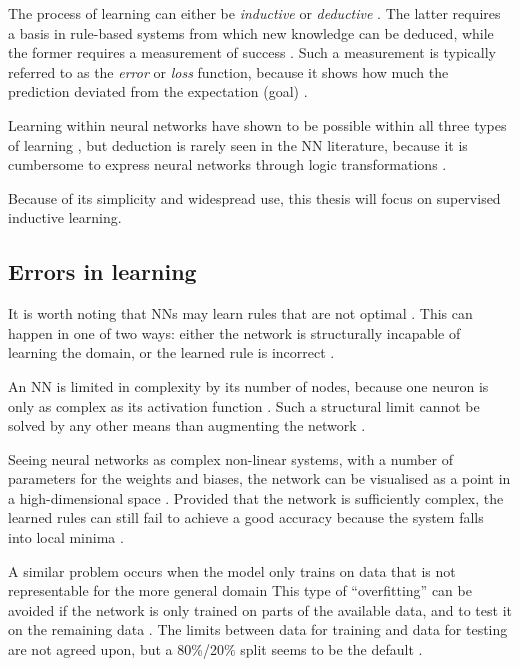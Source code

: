 \documentclass[report.tex]{subfiles}
\begin{document}
The process of learning can either be \textit{inductive}
or \textit{deductive}  \cite[p. 704]{Russel2007}.
The latter requires a basis in rule-based systems from which new knowledge can
be deduced, while the former requires a measurement of success \cite[p. 705]{Russel2007}.
Such a measurement is typically referred to as the \textit{error} or \textit{loss}
function,
because it shows how much the prediction deviated from the expectation (goal)
\cite{Russel2007}.

Learning within neural networks have shown to be possible within all three
types of learning \cite{Schmidhuber2014, Russel2007}, but deduction is rarely
seen in the \gls{NN} literature, because it is cumbersome to express neural
networks through logic transformations \cite{Pearl2018}.

Because of its simplicity and widespread use, this thesis will focus on supervised
inductive learning.

\subsection{Errors in learning}
It is worth noting that \gls{NN}s may learn 
rules  that are not optimal \cite{Russel2007}.
This can happen in one of two ways: either the
network is structurally incapable of learning the domain, 
or the learned rule is incorrect \cite{Russel2007, Eliasmith2015}.

An \gls{NN} is limited in complexity by its number of nodes,
because one neuron is only as complex as its activation function
\cite{Dayan2001, Russel2007}.
Such a structural limit cannot be solved by any other means
than augmenting the network \cite{Russel2007}.

Seeing neural networks as complex non-linear systems, with
a number of parameters for the weights and biases,
the network can be visualised as a point in a high-dimensional space 
\cite{Russel2007}. 
Provided that the network is sufficiently complex, the 
learned rules can still fail to achieve a good accuracy because
the system falls into local minima \cite{Russel2007}.

A similar problem occurs when the model only trains on data
that is not representable for the more general domain \cite{Russel2007}
This type of ``overfitting'' can be avoided if the network
is only trained on parts of the available data, and to test it on 
the remaining data \cite{Russel2007, Schmidhuber2014}.
The limits between data for training and data for testing
are not agreed upon, but a 80\%/20\% split seems to be
the default \cite{Russel2007, Schmidhuber2014}.
\end{document}
